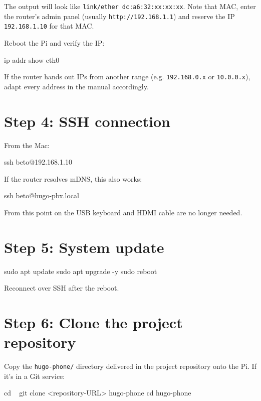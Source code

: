 The output will look like \texttt{link/ether dc:a6:32:xx:xx:xx}. Note that MAC, enter the router's admin panel (usually \texttt{http://192.168.1.1}) and reserve the IP \texttt{192.168.1.10} for that MAC.

Reboot the Pi and verify the IP:

\begin{shellcode}
ip addr show eth0
\end{shellcode}

\begin{tip}
If the router hands out IPs from another range (e.g. \texttt{192.168.0.x} or \texttt{10.0.0.x}), adapt every address in the manual accordingly.
\end{tip}

\section{Step 4: SSH connection}

From the Mac:

\begin{shellcode}
ssh beto@192.168.1.10
\end{shellcode}

If the router resolves mDNS, this also works:

\begin{shellcode}
ssh beto@hugo-pbx.local
\end{shellcode}

From this point on the USB keyboard and HDMI cable are no longer needed.

\section{Step 5: System update}

\begin{shellcode}
sudo apt update
sudo apt upgrade -y
sudo reboot
\end{shellcode}

Reconnect over SSH after the reboot.

\section{Step 6: Clone the project repository}

Copy the \texttt{hugo-phone/} directory delivered in the project repository onto the Pi. If it's in a Git service:

\begin{shellcode}
cd ~
git clone <repository-URL> hugo-phone
cd hugo-phone
\end{shellcode}

